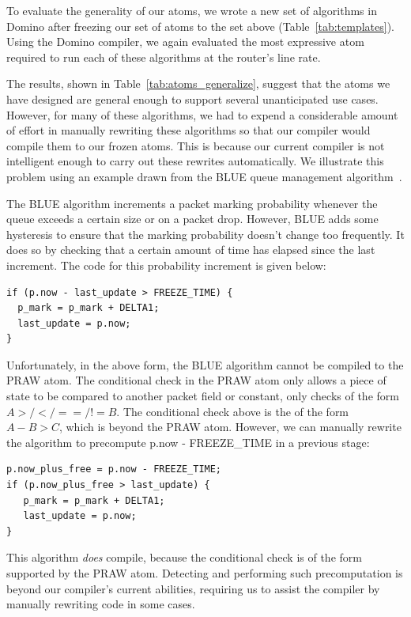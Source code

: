 To evaluate the generality of our atoms, we wrote a new set of algorithms in
Domino after freezing our set of atoms to the set above
(Table~\ref{tab:templates}). Using the Domino compiler, we again evaluated the
most expressive atom required to run each of these algorithms at the router's
line rate.


The results, shown in Table~\ref{tab:atoms_generalize}, suggest that the atoms
we have designed are general enough to support several unanticipated use cases.
However, for many of these algorithms, we had to expend a considerable amount
of effort in manually rewriting these algorithms so that our compiler would
compile them to our frozen atoms. This is because our current compiler is not
intelligent enough to carry out these rewrites automatically. We illustrate
this problem using an example drawn from the BLUE queue management
algorithm~\cite{blue}.

The BLUE algorithm increments a packet marking probability whenever the queue
exceeds a certain size or on a packet drop. However, BLUE adds some hysteresis
to ensure that the marking probability doesn't change too frequently. It does
so by checking that a certain amount of time has elapsed since the last
increment.  The code for this probability increment is given below:

\begin{verbatim}
if (p.now - last_update > FREEZE_TIME) {
  p_mark = p_mark + DELTA1;
  last_update = p.now;
}
\end{verbatim}

Unfortunately, in the above form, the BLUE algorithm cannot be compiled to the
PRAW atom. The conditional check in the PRAW atom only allows a piece of state
to be compared to another packet field or constant, \ie only checks of the form
$A >/</==/!= B$. The conditional check above is the of the form $A - B
> C$, which is beyond the PRAW atom. However, we can manually rewrite the
algorithm to precompute p.now - FREEZE\_TIME in a previous stage:

\begin{verbatim}
p.now_plus_free = p.now - FREEZE_TIME;
if (p.now_plus_free > last_update) {
   p_mark = p_mark + DELTA1;
   last_update = p.now;
}
\end{verbatim}

This algorithm {\em does} compile, because the conditional check is of the form
supported by the PRAW atom. Detecting and performing such precomputation is
beyond our compiler's current abilities, requiring us to assist the compiler by
manually rewriting code in some cases. 

